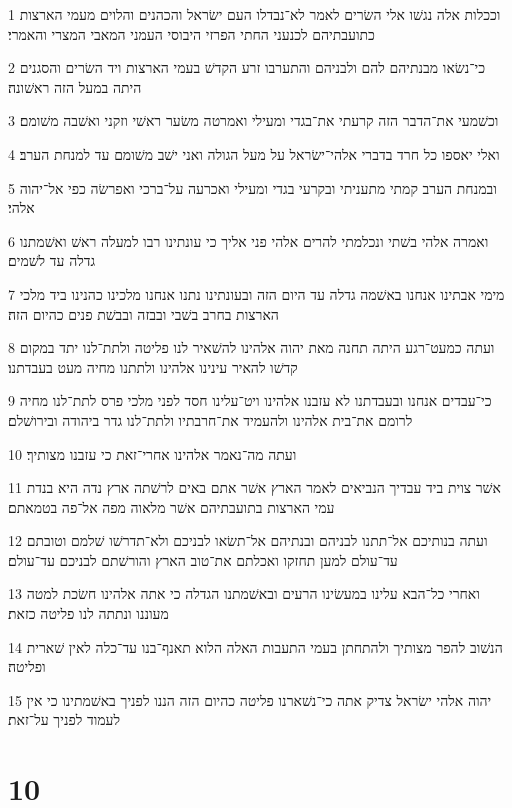 \par 1 וככלות אלה נגשׁו אלי השׂרים לאמר לא־נבדלו העם ישׂראל והכהנים והלוים מעמי הארצות כתועבתיהם לכנעני החתי הפרזי היבוסי העמני המאבי המצרי והאמרי׃
\par 2 כי־נשׂאו מבנתיהם להם ולבניהם והתערבו זרע הקדשׁ בעמי הארצות ויד השׂרים והסגנים היתה במעל הזה ראשׁונה׃
\par 3 וכשׁמעי את־הדבר הזה קרעתי את־בגדי ומעילי ואמרטה משׂער ראשׁי וזקני ואשׁבה משׁומם׃
\par 4 ואלי יאספו כל חרד בדברי אלהי־ישׂראל על מעל הגולה ואני ישׁב משׁומם עד למנחת הערב׃
\par 5 ובמנחת הערב קמתי מתעניתי ובקרעי בגדי ומעילי ואכרעה על־ברכי ואפרשׂה כפי אל־יהוה אלהי׃
\par 6 ואמרה אלהי בשׁתי ונכלמתי להרים אלהי פני אליך כי עונתינו רבו למעלה ראשׁ ואשׁמתנו גדלה עד לשׁמים׃
\par 7 מימי אבתינו אנחנו באשׁמה גדלה עד היום הזה ובעונתינו נתנו אנחנו מלכינו כהנינו ביד מלכי הארצות בחרב בשׁבי ובבזה ובבשׁת פנים כהיום הזה׃
\par 8 ועתה כמעט־רגע היתה תחנה מאת יהוה אלהינו להשׁאיר לנו פליטה ולתת־לנו יתד במקום קדשׁו להאיר עינינו אלהינו ולתתנו מחיה מעט בעבדתנו׃
\par 9 כי־עבדים אנחנו ובעבדתנו לא עזבנו אלהינו ויט־עלינו חסד לפני מלכי פרס לתת־לנו מחיה לרומם את־בית אלהינו ולהעמיד את־חרבתיו ולתת־לנו גדר ביהודה ובירושׁלם׃
\par 10 ועתה מה־נאמר אלהינו אחרי־זאת כי עזבנו מצותיך׃
\par 11 אשׁר צוית ביד עבדיך הנביאים לאמר הארץ אשׁר אתם באים לרשׁתה ארץ נדה היא בנדת עמי הארצות בתועבתיהם אשׁר מלאוה מפה אל־פה בטמאתם׃
\par 12 ועתה בנותיכם אל־תתנו לבניהם ובנתיהם אל־תשׂאו לבניכם ולא־תדרשׁו שׁלמם וטובתם עד־עולם למען תחזקו ואכלתם את־טוב הארץ והורשׁתם לבניכם עד־עולם׃
\par 13 ואחרי כל־הבא עלינו במעשׂינו הרעים ובאשׁמתנו הגדלה כי אתה אלהינו חשׂכת למטה מעוננו ונתתה לנו פליטה כזאת׃
\par 14 הנשׁוב להפר מצותיך ולהתחתן בעמי התעבות האלה הלוא תאנף־בנו עד־כלה לאין שׁארית ופליטה׃
\par 15 יהוה אלהי ישׂראל צדיק אתה כי־נשׁארנו פליטה כהיום הזה הננו לפניך באשׁמתינו כי אין לעמוד לפניך על־זאת׃

\chapter{10}

